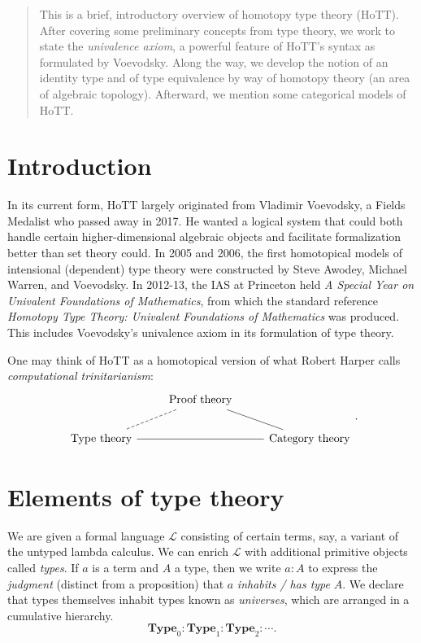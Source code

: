 \documentclass[10pt,letterpaper,cm]{nupset}
\theoremstyle{definition}
\theoremstyle{theorem}
\theoremstyle{remark}
\newcommand{\1}{\mathbf{1}}
\newcommand{\0}{\vec 0}
\begin{document}
\thispagestyle{empty}
\begin{abstract}
This is a brief, introductory overview of homotopy type theory (HoTT). After covering some preliminary concepts from type theory, we work to state the \textit{univalence axiom}, a powerful feature of HoTT's syntax as formulated by Voevodsky. Along the way, we develop the notion of an identity type and of type equivalence by way of homotopy theory (an area of algebraic topology). Afterward, we mention some categorical models of HoTT.
\end{abstract}



\tableofcontents
\newpage


\section*{Introduction}

In its current form, HoTT largely originated from Vladimir Voevodsky, a Fields Medalist who passed away in 2017. He wanted a logical system that could both handle certain higher-dimensional algebraic objects and facilitate formalization better than set theory could. In 2005 and 2006, the first homotopical models of intensional (dependent) type theory were constructed by Steve Awodey, Michael Warren, and Voevodsky. In 2012-13,  the IAS at Princeton held \textit{A Special Year on Univalent Foundations of Mathematics}, from which the standard reference \textit{Homotopy Type Theory: Univalent Foundations of Mathematics} was produced. This includes Voevodsky's univalence axiom in its formulation of type theory.

One may think of HoTT as a homotopical version of what Robert Harper calls \textit{computational trinitarianism}:
\[
\begin{tikzcd}
                                                  & \text{Proof theory} \arrow[ld, no head, dashed] \arrow[rd, no head] &                                  \\
\text{Type theory} \arrow[rr, no head] &                                                                     & \text{Category theory}
\end{tikzcd}
.\]

\section{Elements of type theory}

We are given a formal language $\mathcal{L}$ consisting of certain terms, say, a variant of the untyped lambda calculus. We can enrich $\mathcal{L}$ with additional primitive objects called \textit{types}. If $a$ is a term and $A$ a type, then we write $a: A$ to express the \textit{judgment} (distinct from a proposition) that $a$ \textit{inhabits / has type} $A$. We declare that types themselves inhabit types known as \textit{universes}, which are arranged in a cumulative hierarchy. $$\mathbf{Type}_0 :\mathbf{Type}_1 : \mathbf{Type}_2 : \cdots . $$ 
\end{document}
